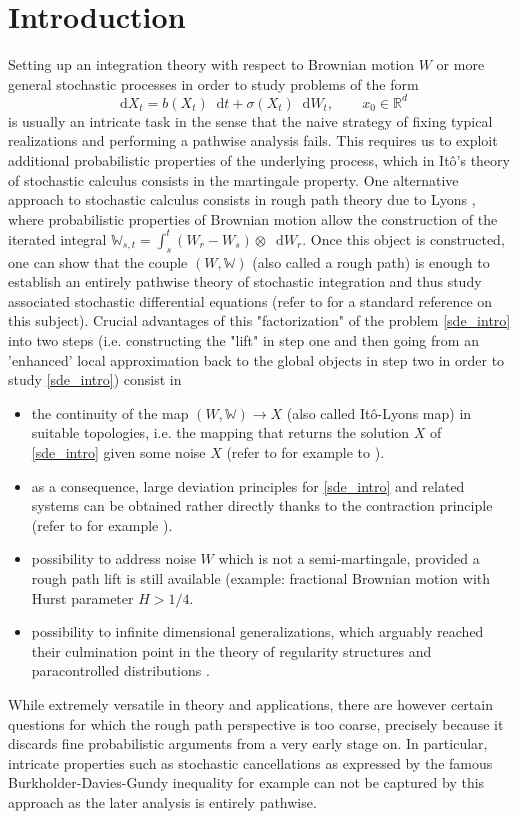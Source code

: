 \documentclass[11pt,oneside,english,reqno]{amsart}
\numberwithin{equation}{section}
\numberwithin{figure}{section}
\theoremstyle{plain}
\theoremstyle{definition}
\theoremstyle{remark}
\theoremstyle{plain}
\theoremstyle{plain}
\theoremstyle{plain}
\theoremstyle{plain}
\theoremstyle{plain}
\newcommand{\RR}{\mathbb{R}}
\newcommand{\dd}{\mathop{}\!\mathrm{d}}
\begin{document}
\section{Introduction}
\noindent Setting up an integration theory with respect to Brownian motion $W$ or more general stochastic processes in order to study problems of the form
\begin{equation}
    \label{sde_intro}
    \dd X_t=b(X_t)\dd t +\sigma(X_t)\dd W_t, \qquad x_0\in \RR^d
\end{equation}
is usually an intricate task in the sense that the naive strategy of fixing typical realizations and performing a pathwise analysis fails. This requires us to exploit additional probabilistic properties of the underlying process, which in It\^o's theory of stochastic calculus consists in the martingale property. One alternative approach to stochastic calculus consists in rough path theory due to Lyons \cite{Lyons1998}, where probabilistic properties of Brownian motion allow the construction of the iterated integral $\mathbb{W}_{s,t}=\int_s^t (W_r-W_s) \otimes \dd W_r$. Once this object is constructed, one can show that the couple $(W, \mathbb{W})$ (also called a rough path) is enough to establish an entirely pathwise theory of stochastic integration and thus study associated stochastic differential equations (refer to \cite{frizhairer} for a standard reference on this subject). Crucial advantages of this "factorization" of the problem \eqref{sde_intro} into two steps (i.e. constructing the "lift" in step one and then going from an 'enhanced' local approximation back to the global objects in step two in order to study \eqref{sde_intro}) consist in 
\begin{itemize}
    \item the continuity of the map $(W,\mathbb W)\to X$ (also called It\^o-Lyons map) in suitable topologies, i.e. the mapping that returns the solution $X$ of \eqref{sde_intro} given some noise $X$ (refer to for example to \cite[Theorem 8.5]{frizhairer}).
    \item as a consequence, large deviation principles for \eqref{sde_intro} and related systems can be obtained rather directly thanks to the contraction principle (refer to for example \cite[Theorem 9.5]{frizhairer}). 
    \item possibility to address noise $W$ which is not a semi-martingale, provided a rough path lift is still available (example: fractional Brownian motion with Hurst parameter $H>1/4$. 
    \item possibility to infinite dimensional generalizations, which arguably reached their culmination point in the theory of regularity structures \cite{Hairer2014} and paracontrolled distributions \cite{gubinelli_imkeller_perkowski_2015}. 
\end{itemize}
While extremely versatile in theory and applications, there are however certain questions for which the rough path perspective is too coarse, precisely because it discards fine probabilistic arguments from a very early stage on. In particular, intricate properties such as stochastic cancellations as expressed by the famous Burkholder-Davies-Gundy inequality for example can not be captured by this approach as the later analysis is entirely pathwise.  
\end{document}
